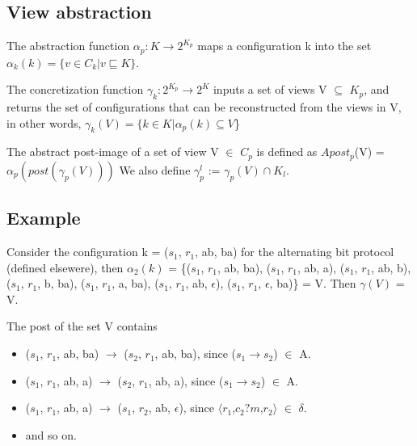 \subsection{View abstraction}
The abstraction function $\alpha_p: K\rightarrow 2^{K_p}$ maps a configuration k into the set $\alpha_k(k) = \{v\in C_k | v\sqsubseteq K\}$. 

The concretization function $\gamma_k: 2^{K_p} \rightarrow 2^K$ inputs a set of views V $\subseteq$ $K_p$, and returns the set of configurations that can be reconstructed from the views in V, in other words, $\gamma_k(V) = \{k \in K | \alpha_p(k) \subseteq V$\}

The abstract post-image of a set of view V $\in$ $C_p$ is defined as $Apost_p$(V) = $\alpha_p(post(\gamma_p(V)))$ We also define $\gamma_p^l$ := $\gamma_p(V) \cap K_l$.



\subsection{Example}
Consider the configuration k = ($s_1$, $r_1$, ab, ba) for the alternating bit protocol (defined elsewere), then $\alpha_2(k)$ = \{($s_1$, $r_1$, ab, ba), ($s_1$, $r_1$, ab, a), ($s_1$, $r_1$, ab, b), ($s_1$, $r_1$, b, ba), ($s_1$, $r_1$, a, ba), ($s_1$, $r_1$, ab, $\epsilon$), ($s_1$, $r_1$, $\epsilon$, ba)\} = V. Then $\gamma(V)$ = V.

The post of the set V contains
\begin{itemize}
\item
($s_1$, $r_1$, ab, ba) $\rightarrow$ ($s_2$, $r_1$, ab, ba), since ($s_1$$\rightarrow$$s_2$) $\in$ A.
\item
($s_1$, $r_1$, ab, a) $\rightarrow$ ($s_2$, $r_1$, ab, a), since ($s_1$$\rightarrow$$s_2$) $\in$ A.
\item
($s_1$, $r_1$, ab, a) $\rightarrow$ ($s_1$, $r_2$, ab, $\epsilon$), since $\langle$$r_1$,$c_2?m$,$r_2$$\rangle$ $\in$ $\delta$.
\item
and so on.
\end{itemize}
